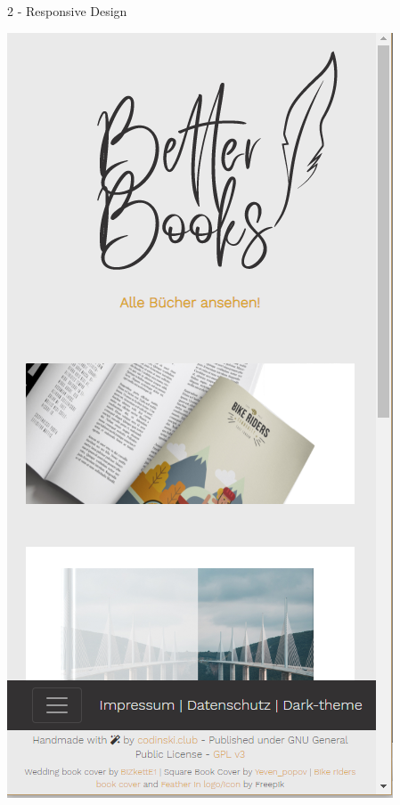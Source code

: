 \documentclass[a4paper]{article}
\begin{document}
\begin{exercise}{2 - Responsive Design}
\begin{flushleft}
\includegraphics[scale=0.5]{../2_bookstore_main_mobile}\\


\end{flushleft}
\end{exercise}
\end{document}
